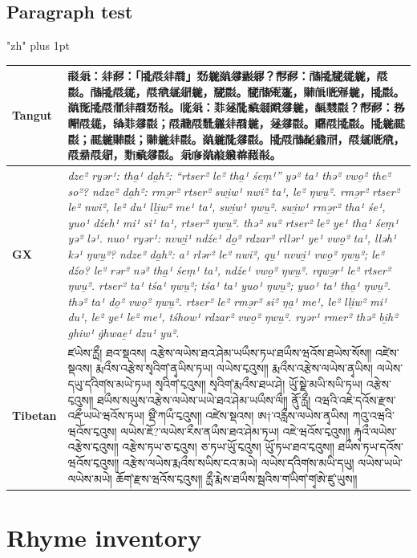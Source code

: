 \documentclass[12pt]{nextart}
\begin{document}
\subsection{Paragraph test}

\begingroup
\XeTeXlinebreaklocale "zh"
\XeTeXlinebreakskip=0pt plus 1pt
\sloppy
\small
\renewcommand{\arraystretch}{1.2}
\begin{longtable}{@{}p{}>{\raggedright\arraybackslash}p{}@{}}
\toprule
\textbf{Tangut} & 𘈒𗤄：𗢳𘒣：「𗎫𘟀𗢳𗵆」𘘣𗫂𘌽𗧘𘝶𗦜？𘘚𘒣：𗰜𗎫𗮔𗩱𗫂，𘟀𘟂。𗰜𗎫𘟀𗩱，𘟀𘟣𗦇𗤋𗫂，𗮔𘟂。𗮔𗰜𗋕𗡶，𘉐𗭍𗅋𗋃𗫂，𗎫𘟂。𘌽𗍊𗎫𘟀𗗙𗢳𗵆𘘣𘃞。𗅉𗤄：𘎳𗫻𘁟𗈞𗥃𘍦𗧘𗫂，𘓂𘙌𘟂？𘘚𘒣：𗈪𗆫𘟀𗩱，𗌭𘎳𗧘𘟂；𘟀𘘂𘟀𘙇𗫡𗢳𗵆𗫂，𗫻𗧘𘟂。𘓷𘟀𗎫𘟂。𗎫𗫂𗵘𘟂；𗵘𗫂𘉐𘟂；𘉐𗫂𗢳𘟂。𘌽𗫂𘁟𗧘𘟂。𗎫𘟀𗰜𘖀𗲠𗘺，𘟀𗦇𗅋𘟣，𘟀𘝵𘟀𗤋，𘘦𗈞𗧘𘟂。𗤄𗇋𘌽𗓨𗪲𗒐𘒩𘕤。 \\
\midrule
\textbf{GX} & \emph{dze² ryər¹: tha̱¹ da̱h²: ``rtser² le² tha̱¹ śeṃ¹'' yə² ta¹ thə² vwo̱² the² so²? ndze² da̱h²: rmə̱r² rtser² swi̱w¹ nwi² ta¹, le² ŋwu̱². rmə̱r² rtser² le² nwi², le² du¹ lli̱w² me¹ ta¹, swi̱w¹ ŋwu̱². swi̱w¹ rmə̱r² tha¹ śe¹, yuo¹ dźeh¹ mi¹ si¹ ta¹, rtser² ŋwu̱². thə² su² rtser² le² ye¹ tha̱¹ śeṃ¹ yə² lə¹. nuo¹ ryər¹: nvwi̱¹ ndźe¹ do̱² rdzar² rllər¹ ye¹ vwo̱² ta¹, lləh¹ kə¹ ŋwu̱²? ndze² da̱h²: a¹ rlər² le² nwi², qu̱¹ nvwi̱¹ vwo̱² ŋwu̱²; le² dźo? le² rər² nə² tha̱¹ śeṃ¹ ta¹, ndźe¹ vwo̱² ŋwu̱². rqwə̱r¹ le² rtser² ŋwu̱². rtser² ta¹ tśa¹ ŋwu̱²; tśa¹ ta¹ yuo¹ ŋwu̱²; yuo¹ ta¹ tha̱¹ ŋwu̱². thə² ta¹ do̱² vwo̱² ŋwu̱². rtser² le² rmə̱r² si² ŋa̱¹ me¹, le² lli̱w² mi¹ du¹, le² ye¹ le² me¹, tśhow¹ rdzar² vwo̱² ŋwu̱². ryər¹ rmer² thə² bi̱h² ghiw¹ ġhwae̱¹ dzu¹ yu².} \\
\midrule
\textbf{Tibetan} & ཛཡེས་རྻྀ། ཐའ་སྡའས། འརྩེས་ལཡེས་ཐའ་ཤེམ་ཡཡྀས་ཏཡ་ཐཡྀས་ཝའོས་ཐཡེས་སོས༎ འཛེས་སྡའས། རྨའྀས་འརྩེས་སྭའིག༹་ནྭཡིས་ཏཡ། ལཡེས་ངྭའུས༎ རྨའྀས་འརྩེས་ལཡེས་ནྭཡིས། ལཡེས་དཡུ་ད༹འིག༹ས་མཡེ་ཏཡ། སྭའིག༹་ངྭའུས༎ སྭའིག༹་རྨའྀས་ཐཡ་ཤེ། ཡོུ་སྗེ་མཡི་སཡི་ཏཡ། འརྩེས་ངྭའུས༎ ཐཡྀས་སཡུས་འརྩེས་ལཡེས་ཡཡེ་ཐའ་ཤེམ་ཡཡྀས་ལྀ༎ ནོུ་རྻྀ། འཝའི་འཇེ་དའོས་རྫས་འརྡྀ༹་ཡཡེ་ཝའོས་ཏཡ། སྡྀ༹་ཀཡྀ་ངྭའུས༎ འཛེས་སྡའས། ཨ†་འརླྀས་ལཡེས་ནྭཡིས། ཀའུ་འཝའི་ཝའོས་ངྭའུས། ལཡེས་ཇོ?་ལཡེས་རྀས་ནཡྀས་ཐའ་ཤེམ་ཏཡ། འཇེ་ཝའོས་ངྭའུས༎ རྐྭའྀ་ལཡེས་འརྩེས་ངྭའུས༎ འརྩེས་ཏཡ་ཅ་ངྭའུས། ཅ་ཏཡ་ཡོུ་ངྭའུས། ཡོུ་ཏཡ་ཐའ་ངྭའུས༎ ཐཡྀས་ཏཡ་དའོས་ཝའོས་ངྭའུས༎ འརྩེས་ལཡེས་རྨའྀས་སཡིས་ངའ་མཡེ། ལཡེས་ད༹འིག༹ས་མཡི་དཡུ། ལཡེས་ཡཡེ་ལཡེས་མཡེ། ཆོག༹་རྫས་ཝའོས་ངྭའུས༎ རྻྀ་རྨེས་ཐཡྀས་སྦའིས་ག༹ཡིག༹་གྭ༹ཨེ་ཛུ་ཡུས༎ \\
\bottomrule
\end{longtable}
\normalsize
\endgroup

\section{Rhyme inventory}
\setlength{\tabcolsep}{1pt}
\end{document}
